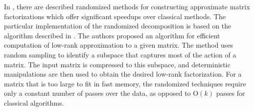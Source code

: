 In \cite{Woolfe2008, Candes2011, Martinsson2011}, there are described randomized methods for constructing approximate matrix factorizations which offer significant speedups over classical methods. The particular implementation of the randomized decomposition is based on the algorithm described in \cite{Halko2011}. The authors proposed an algorithm for efficient computation of low-rank approximation to a given matrix. The method uses random sampling to identify a subspace that captures most of the action of a matrix. The input matrix is compressed to this subspace, and deterministic manipulations are then used to obtain the desired low-rank factorization. For a matrix that is too large to fit in fast memory, the randomized techniques require only a constant number of passes over the data, as opposed to $\mathrm{O}(k)$ passes for classical algorithms.